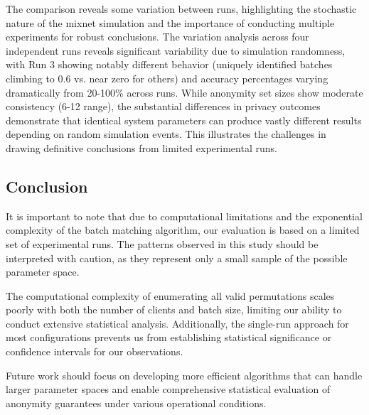 \documentclass{article}
\begin{document}
The comparison reveals some variation between runs, highlighting 
the stochastic nature of the mixnet simulation and the importance 
of conducting multiple experiments for robust conclusions. The 
variation analysis across four independent runs reveals 
significant variability due to simulation randomness, with Run 3 
showing notably different behavior (uniquely identified batches 
climbing to 0.6 vs. near zero for others) and accuracy percentages 
varying dramatically from 20-100\% across runs. While anonymity 
set sizes show moderate 
consistency (6-12 range), the substantial differences 
in privacy outcomes demonstrate that identical system 
parameters can produce vastly different results depending 
on random simulation events. This illustrates the challenges in drawing 
definitive conclusions from limited experimental runs.


\subsection{Conclusion}
It is important to note that due to computational limitations 
and the exponential complexity of the batch matching algorithm, 
our evaluation is based on a limited set of experimental runs. 
The patterns observed in this study should be interpreted with 
caution, as they represent only a small sample of the possible 
parameter space.

The computational complexity of enumerating all valid permutations 
scales poorly with both the number of clients and batch size, 
limiting our ability to conduct extensive statistical analysis. 
Additionally, the single-run approach for most configurations 
prevents us from establishing statistical significance or 
confidence intervals for our observations.

Future work should focus on developing more efficient algorithms 
that can handle larger parameter spaces and enable comprehensive 
statistical evaluation of anonymity guarantees under various 
operational conditions.
\end{document}
